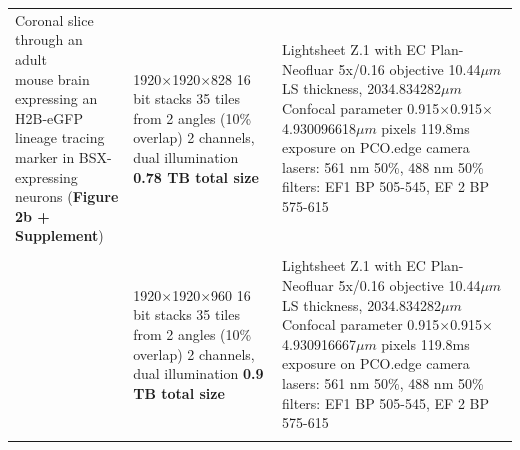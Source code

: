 \documentclass[]{spie}  %
\begin{document}
\begin{landscape}
{\begin{longtable}{lll}
 \multirowcell{2}[-4ex][l]{Coronal slice through an adult \\mouse brain expressing an H2B-eGFP \\lineage tracing marker in BSX-expressing \\neurons (\textbf{Figure 2b + Supplement})} &            \makecell[l]{1920$\times$1920$\times$828 16 bit stacks\\35 tiles from 2 angles (10\% overlap) \\2 channels, dual illumination\\\textbf{0.78 TB total size}}  &                                                                    \makecell[l]{Lightsheet Z.1 with EC Plan-Neofluar 5x/0.16 objective \\10.44$\mu{}m$ LS thickness, 2034.834282$\mu{}m$ Confocal parameter\\0.915$\times$0.915$\times$4.930096618$\mu{}m$ pixels\\119.8ms exposure on PCO.edge camera\\lasers: 561 nm 50\%, 488 nm 50\%\\filters: EF1 BP 505-545, EF 2 BP 575-615} \\ \\
                                                                                                                                    &             \makecell[l]{1920$\times$1920$\times$960 16 bit stacks\\35 tiles from 2 angles (10\% overlap) \\2 channels, dual illumination\\\textbf{0.9 TB total size}}  &                                                                    \makecell[l]{Lightsheet Z.1 with EC Plan-Neofluar 5x/0.16 objective \\10.44$\mu{}m$ LS thickness, 2034.834282$\mu{}m$ Confocal parameter\\0.915$\times$0.915$\times$4.930916667$\mu{}m$ pixels\\119.8ms exposure on PCO.edge camera\\lasers: 561 nm 50\%, 488 nm 50\%\\filters: EF1 BP 505-545, EF 2 BP 575-615} \\ \\


\end{longtable}}
\end{landscape}
\end{document}
